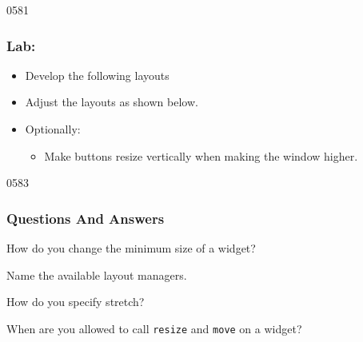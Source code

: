 \begin{slide}{0581}\frametitle{Lab: }
  \label{stretching}  
  \begin{itemize}
  \item Develop the following layouts
  \item Adjust the layouts as shown below.
  \item Optionally:
    \begin{itemize}
    \item Make buttons resize vertically when making the window higher.
    \end{itemize}
  \end{itemize}
\end{slide}


\begin{slide}{0583}\frametitle{Questions And Answers}\label{layoutQuestions}
  \begin{questionize}
  \item How do you change the minimum size of a widget?
  \item Name the available layout managers.
  \item How do you specify stretch?
  \item When are you allowed to call \texttt{resize} and \texttt{move} on a
    widget?
  \end{questionize}
\end{slide}
